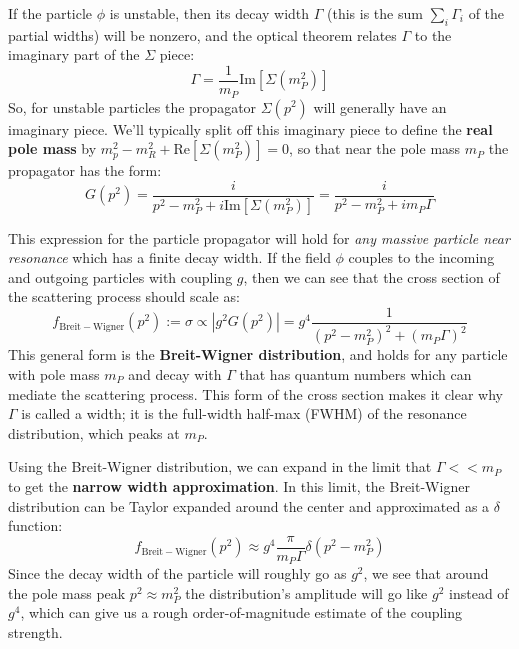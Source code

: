 \documentclass[11pt, oneside]{article}   	%
\theoremstyle{definition}
\numberwithin{equation}{subsection}		%
\begin{document}
If the particle $\phi$ is unstable, then its decay width $\Gamma$ (this is the sum $\sum_i \Gamma_i$ of the partial widths) will be nonzero, and the 
optical theorem relates $\Gamma$ to the imaginary part of the $\Sigma$ piece:
\begin{equation}
	\Gamma = \frac{1}{m_P}\mathrm{Im}\left[\Sigma(m_P^2)\right]
\end{equation}
So, for unstable particles the propagator $\Sigma(p^2)$ will generally have an imaginary piece. We'll typically split off this imaginary piece to 
define the \textbf{real pole mass} by $m_p^2 - m_R^2 + \mathrm{Re}\left[\Sigma(m_P^2)\right] = 0$, so that near the pole mass $m_P$ the 
propagator has the form:
\begin{equation}
	G(p^2) = \frac{i}{p^2 - m_P^2 + i\mathrm{Im}[\Sigma(m_P^2)]} = \frac{i}{p^2 - m_P^2 + i m_P \Gamma}
\end{equation}

This expression for the particle propagator will hold for \textit{any massive particle near resonance} which has a finite decay width. If the field 
$\phi$ couples to the incoming and outgoing particles with coupling $g$, then we can see that the cross section of the scattering process should 
scale as:
\begin{equation}
	f_\mathrm{Breit-Wigner}(p^2) := \sigma\propto |g^2 G(p^2) | = g^4\frac{1}{(p^2 - m_P^2)^2 + (m_P \Gamma)^2}
\end{equation}
This general form is the \textbf{Breit-Wigner distribution}, and holds for any particle with pole mass $m_P$ and decay with $\Gamma$ that has 
quantum numbers which can mediate the scattering process. This form of the cross section makes it clear why $\Gamma$ is called a width; 
it is the full-width half-max (FWHM) of the resonance distribution, which peaks at $m_P$. 

Using the Breit-Wigner distribution, we can expand in the limit that $\Gamma << m_P$ to get the \textbf{narrow width approximation}. In this 
limit, the Breit-Wigner distribution can be Taylor expanded around the center and approximated as a $\delta$ function:
\begin{equation}
	f_\mathrm{Breit-Wigner}(p^2)\approx g^4 \frac{\pi}{m_P \Gamma} \delta(p^2 - m_P^2)
\end{equation}
Since the decay width of the particle will roughly go as $g^2$, we see that around the pole mass peak $p^2\approx m_P^2$ the distribution's 
amplitude will go like $g^2$ instead of $g^4$, which can give us a rough order-of-magnitude estimate of the coupling strength. 
\end{document}
